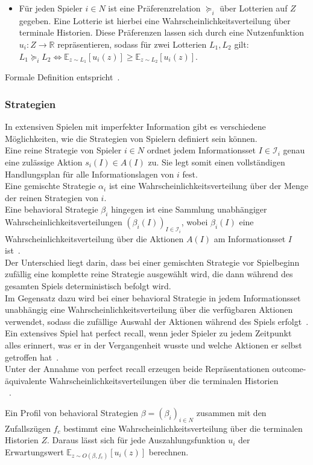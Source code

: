 \begin{itemize}
  \item Für jeden Spieler $i \in N$ ist eine Präferenzrelation $\succeq_i$ über Lotterien auf $Z$ gegeben.
  Eine Lotterie ist hierbei eine Wahrscheinlichkeitsverteilung über terminale Historien.
  Diese Präferenzen lassen sich durch eine Nutzenfunktion $u_i: Z \to \mathbb{R}$ repräsentieren, sodass für zwei Lotterien $L_1, L_2$ gilt:
  $L_1 \succeq_i L_2 \iff \mathbb{E}_{z \sim L_1}[u_i(z)] \ge \mathbb{E}_{z \sim L_2}[u_i(z)]$.
\end{itemize}
Formale Definition entspricht~\cite[Ch.~11, Sec.~11.1, Def.~200.1]{osborne1994course}.

\subsubsection{Strategien}

In extensiven Spielen mit imperfekter Information gibt es verschiedene Möglichkeiten, wie die Strategien von Spielern definiert sein können.\\
Eine reine Strategie von Spieler $i \in N$ ordnet jedem Informationsset $I \in \mathcal{I}_i$ genau eine zulässige Aktion $s_i(I) \in A(I)$ zu.
Sie legt somit einen vollständigen Handlungsplan für alle Informationslagen von $i$ fest.\\
Eine gemischte Strategie $\alpha_i$ ist eine Wahrscheinlichkeitsverteilung über der Menge der reinen Strategien von $i$.\\
Eine behavioral Strategie $\beta_i$ hingegen ist eine Sammlung unabhängiger Wahrscheinlichkeitsverteilungen $(\beta_i(I))_{I \in \mathcal{I}_i}$, wobei $\beta_i(I)$ eine Wahrscheinlichkeitsverteilung über die Aktionen $A(I)$ am Informationsset $I$ ist~\cite[Ch.~11, Sec.~11.4, Def.~212.1]{osborne1994course}.\\
Der Unterschied liegt darin, dass bei einer gemischten Strategie vor Spielbeginn zufällig eine komplette reine Strategie ausgewählt wird, die dann während des gesamten Spiels deterministisch befolgt wird.\\
Im Gegensatz dazu wird bei einer behavioral Strategie in jedem Informationsset unabhängig eine Wahrscheinlichkeitsverteilung über die verfügbaren Aktionen verwendet, sodass die zufällige Auswahl der Aktionen während des Spiels erfolgt~\cite[Ch.~11, Sec.~11.4]{osborne1994course}.\\
Ein extensives Spiel hat perfect recall, wenn jeder Spieler zu jedem Zeitpunkt alles erinnert, was er in der Vergangenheit wusste und welche Aktionen er selbst getroffen hat~\cite[Ch.~11, Sec.~11.1]{osborne1994course}.\\
Unter der Annahme von perfect recall erzeugen beide Repräsentationen outcome-\\äquivalente Wahrscheinlichkeitsverteilungen über die terminalen Historien\\~\cite[Ch.~11, Sec.~11.4, Prop.~214.1]{osborne1994course}.

Ein Profil von behavioral Strategien $\beta=(\beta_i)_{i\in N}$ zusammen mit den Zufallszügen $f_c$ bestimmt eine Wahrscheinlichkeitsverteilung über die terminalen Historien $Z$.
Daraus lässt sich für jede Auszahlungsfunktion $u_i$ der Erwartungswert $\mathbb{E}_{z \sim O(\beta, f_c)}[u_i(z)]$ berechnen.
